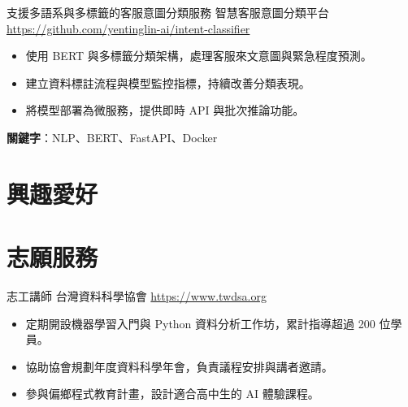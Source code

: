\documentclass[a4paper, serif, 10pt]{moderncv}
\begin{document}
        {支援多語系與多標籤的客服意圖分類服務}
        {智慧客服意圖分類平台}
        {\url{https://github.com/yentinglin-ai/intent-classifier}}
        {}
        {\begin{itemize}
\item 使用 BERT 與多標籤分類架構，處理客服來文意圖與緊急程度預測。
\item 建立資料標註流程與模型監控指標，持續改善分類表現。
\item 將模型部署為微服務，提供即時 API 與批次推論功能。
\end{itemize}
\textbf{關鍵字}：NLP、BERT、FastAPI、Docker}
\section{興趣愛好}

\section{志願服務}

        {志工講師}
        {台灣資料科學協會}
        {\url{https://www.twdsa.org}}
        {}
        {\begin{itemize}
\item 定期開設機器學習入門與 Python 資料分析工作坊，累計指導超過 200 位學員。
\item 協助協會規劃年度資料科學年會，負責議程安排與講者邀請。
\item 參與偏鄉程式教育計畫，設計適合高中生的 AI 體驗課程。
\end{itemize}}
    
\end{document}
